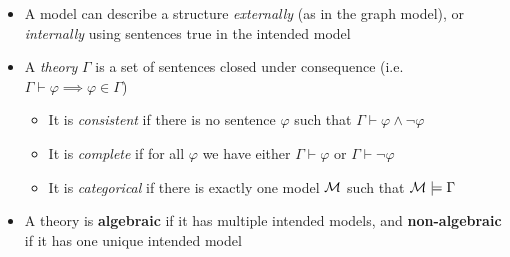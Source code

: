 \begin{itemize}
	\item A model can describe a structure \textit{externally} (as in the graph model), or \textit{internally} using sentences true in the intended model
	
	\item A \textit{theory} $ \Gamma $ is a set of sentences closed under consequence (i.e. $ \Gamma \vdash \varphi \implies \varphi \in \Gamma $)
	
	\begin{itemize}
		
		\item It is \textit{consistent} if there is no sentence $ \varphi $ such that $ \Gamma \vdash \varphi \land \lnot \varphi $
		
		\item It is \textit{complete} if for all $ \varphi $ we have either $ \Gamma \vdash \varphi $ or $ \Gamma \vdash \lnot \varphi $
		
		\item It is \textit{categorical} if there is exactly one model $ \mathcal{M} $ such that $ \mathcal{M} \models \Gamma $
		
	\end{itemize}
	
	\item A theory is \textbf{algebraic} if it has multiple intended models, and \textbf{non-algebraic} if it has one unique intended model
	
\end{itemize}

\newpage